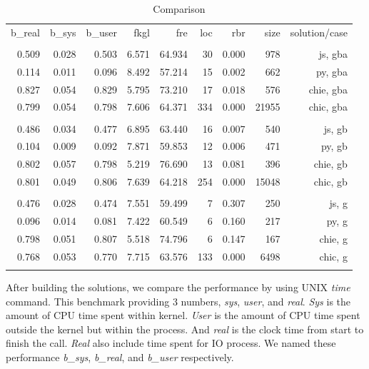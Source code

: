 \documentclass[conference]{IEEEtran}
\begin{document}
\begin{table}[]
\centering
\caption{Comparison}
\label{tbl:comparison}
\begin{tabular}{@{}rrrrrrrrr@{}}
\toprule
    b\_real & b\_sys & b\_user &  fkgl &    fre & loc &   rbr &  size & solution/case \\
            &        &         &       &        &     &       &       &               \\ \midrule 
      0.509 &  0.028 & 0.503   & 6.571 & 64.934 &  30 & 0.000 &   978 &       js, gba \\
      0.114 &  0.011 & 0.096   & 8.492 & 57.214 &  15 & 0.002 &   662 &       py, gba \\
      0.827 &  0.054 & 0.829   & 5.795 & 73.210 &  17 & 0.018 &   576 &     chie, gba \\
      0.799 &  0.054 & 0.798   & 7.606 & 64.371 & 334 & 0.000 & 21955 &     chic, gba \\
            &        &         &       &        &     &       &       &               \\ \midrule 
      0.486 &  0.034 & 0.477   & 6.895 & 63.440 &  16 & 0.007 &   540 &       js, gb  \\
      0.104 &  0.009 & 0.092   & 7.871 & 59.853 &  12 & 0.006 &   471 &       py, gb  \\
      0.802 &  0.057 & 0.798   & 5.219 & 76.690 &  13 & 0.081 &   396 &     chie, gb  \\
      0.801 &  0.049 & 0.806   & 7.639 & 64.218 & 254 & 0.000 & 15048 &     chic, gb  \\
            &        &         &       &        &     &       &       &               \\ \midrule 
      0.476 &  0.028 & 0.474   & 7.551 & 59.499 &   7 & 0.307 &   250 &       js, g   \\
      0.096 &  0.014 & 0.081   & 7.422 & 60.549 &   6 & 0.160 &   217 &       py, g   \\
      0.798 &  0.051 & 0.807   & 5.518 & 74.796 &   6 & 0.147 &   167 &     chie, g   \\
      0.768 &  0.053 & 0.770   & 7.715 & 63.576 & 133 & 0.000 &  6498 &     chic, g   \\
            &        &         &       &        &     &      &       &       &        \\ \midrule 
\end{tabular}
\end{table}

After building the solutions, we compare the performance by using UNIX {\it time} command. This benchmark providing 3 numbers, {\it sys}, {\it user}, and {\it real}. {\it Sys} is the amount of CPU time spent within kernel. {\it User} is the amount of CPU time spent outside the kernel but within the process. And {\it real} is the clock time from start to finish the call. {\it Real} also include time spent for IO process. We named these performance {\it b\_sys}, {\it b\_real}, and {\it b\_user} respectively.
\end{document}
